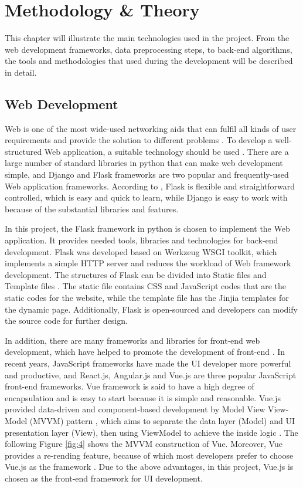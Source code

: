\chapter{Methodology \& Theory}
\label{ch:methodology}

This chapter will illustrate the main technologies used in the project. From the web development frameworks, data preprocessing steps, to back-end algorithms, the tools and methodologies that used during the development will be described in detail.


\section{Web Development}

Web is one of the most wide-used networking aids that can fulfil all kinds of user requirements and provide the solution to different problems \cite{lokhande2015efficient}. To develop a well-structured Web application, a suitable technology should be used \cite{lokhande2015efficient}. There are a large number of standard libraries in python that can make web development simple, and Django and Flask frameworks are two popular and frequently-used Web application frameworks. According to \cite{ghimire2020comparative}, Flask is flexible and straightforward controlled, which is easy and quick to learn, while Django is easy to work with because of the substantial libraries and features. 

In this project, the Flask framework in python is chosen to implement the Web application. It provides needed tools, libraries and technologies for back-end development. Flask was developed based on Werkzeug WSGI toolkit, which implements a simple HTTP server and reduces the workload of Web framework development. The structures of Flask can be divided into Static files and Template files \cite{lokhande2015efficient}. The static file contains CSS and JavaScript codes that are the static codes for the website, while the template file has the Jinjia templates for the dynamic page. Additionally, Flask is open-sourced and developers can modify the source code for further design.

In addition, there are many frameworks and libraries for front-end web development, which have helped to promote the development of front-end \cite{dinh2020modern}. In recent years, JavaScript frameworks have made the UI developer more powerful and productive, and React.js, Angular.js and Vue.js are three popular JavaScript front-end frameworks. Vue framework is said to have a high degree of encapsulation and is easy to start because it is simple and reasonable. Vue.js provided data-driven and component-based development by Model View View-Model (MVVM) pattern \cite{li2021research}, which aims to separate the data layer (Model) and UI presentation layer (View), then using ViewModel to achieve the inside logic \cite{anderson2012model}. The following Figure \ref{fig:4} shows the MVVM construction of Vue. Moreover, Vue provides a re-rending feature, because of which most developers prefer to choose Vue.js as the framework \cite{novac2021comparative}. Due to the above advantages, in this project, Vue.js is chosen as the front-end framework for UI development.

